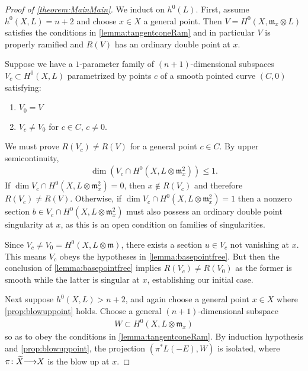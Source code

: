 \documentclass[11pt,reqno]{amsart}
\theoremstyle{plain}
\theoremstyle{definition}
\theoremstyle{remark}
\numberwithin{equation}{section}
\DeclareMathOperator{\dm}{dim}
\renewcommand{\to}{{\longrightarrow}}
\numberwithin{equation}{section}
\begin{document}
\begin{proof}[Proof of \autoref{theorem:MainMain}]
  We induct on $h^{0}(L)$.  First, assume $h^{0}(X,L) = n+2$ and choose $x \in X$ a general point. Then $V  =  H^{0}(X,{\mathfrak m}_{x}\otimes L)$ satisfies the conditions in \autoref{lemma:tangentconeRam} and in particular $V$ is properly ramified and $R(V)$ has an ordinary double point at $x$.  

  Suppose we have a $1$-parameter family of $(n+1)$-dimensional subspaces $V_{c} \subset H^{0}(X,L)$ parametrized by points $c$ of a smooth pointed curve $(C,0)$ satisfying:
  \begin{enumerate}
  \item $V_{0} = V$ 
  \item $V_{c} \neq V_{0}$ for $c \in C$, $c \neq 0$.
  \end{enumerate}
  We must prove $R(V_{c}) \neq R(V)$ for a general point $c \in C$. By upper semicontinuity, 
  \begin{align*}
    \dm \left(V_{c} \cap H^{0}(X,L \otimes \mathfrak{m}^{2}_{x})\right) \leq 1.
  \end{align*}
If $\dm V_{c} \cap H^{0}(X,L \otimes \mathfrak{m}^{2}_{x}) = 0$, then $x \notin R(V_{c})$ and therefore $R(V_{c}) \neq R(V)$.  Otherwise, if $\dm V_{c} \cap H^{0}(X,L \otimes \mathfrak{m}^{2}_{x}) = 1$ then a nonzero section $b \in V_{c} \cap H^{0}(X,L \otimes \mathfrak{m}^{2}_{x})$ must also possess an ordinary double point singularity at $x$, as this is an open condition on families of singularities.

Since $V_{c} \neq V_{0} = H^{0}(X,L\otimes\mathfrak{m})$, there exists a section $u \in V_{c}$ not vanishing at $x$.  This means $V_{c}$ obeys the hypotheses in \autoref{lemma:basepointfree}. But then the conclusion of \autoref{lemma:basepointfree} implies $R(V_{c}) \neq R(V_{0})$ as the former is smooth while the latter is singular at $x$, establishing our initial case.


Next suppose $h^{0}(X,L) > n+2$, and again choose a general point $x \in X$ where \autoref{prop:blowuppoint} holds. Choose a general $(n+1)$-dimensional subspace 
\begin{align*}
  W \subset  H^{0}(X, L \otimes {\mathfrak m}_{x})
\end{align*}
so as to obey the conditions in \autoref{lemma:tangentconeRam}. By induction hypothesis and \autoref{prop:blowuppoint}, the projection $(\pi^{*}L(-E),W)$ is isolated, where $\pi\from \widetilde{X} \to X$ is the blow up at $x$.  


\end{proof}
\end{document}
